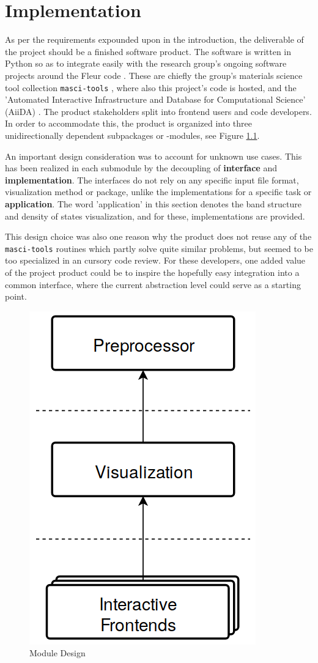 
\chapter{Implementation}
\label{chap:implementation}


As per the requirements expounded upon in the introduction, the deliverable of
the project should be a finished software product. The software is written in
Python so as to integrate easily with the research group's ongoing software
projects around the Fleur code \cite{fleur}. These are chiefly the group's
materials science tool collection \texttt{masci-tools} \cite{masci-tools} ,
where also this project's code is hosted, and the 'Automated Interactive
Infrastructure and Database for Computational Science' (AiiDA) \cite{aiida}. The
product stakeholders split into frontend users and code developers. In order to
accommodate this, the product is organized into three unidirectionally dependent
subpackages or -modules, see Figure \ref{fig:modules}.

An important design consideration was to account for unknown use cases. This has
been realized in each submodule by the decoupling of \textbf{interface} and
\textbf{implementation}. The interfaces do not rely on any specific input file
format, visualization method or package, unlike the implementations for a
specific task or \textbf{application}. The word 'application' in this section
denotes the band structure and density of states visualization, and for these,
implementations are provided.

This design choice was also one reason why the product does not reuse any of the
\texttt{masci-tools} routines which partly solve quite similar problems, but
seemed to be too specialized in an cursory code review. For these developers,
one added value of the project product could be to inspire the hopefully easy
integration into a common interface, where the current abstraction level could
serve as a starting point.

\begin{figure}[htb!]
    \centering
    \includegraphics[width=0.3\linewidth]{img/module_design.png}
    \caption{Module Design}
    \label{fig:modules}
\end{figure}

